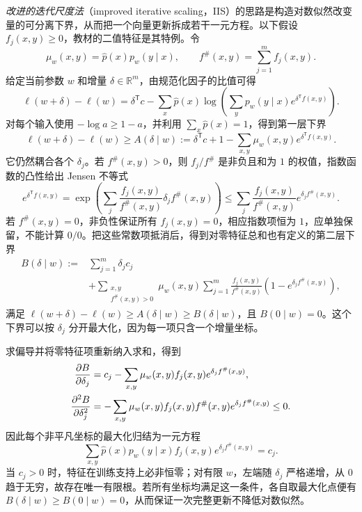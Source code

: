 \emph{改进的迭代尺度法}（improved iterative scaling，IIS）的思路是构造对数似然改变量的可分离下界，从而把一个向量更新拆成若干一元方程。以下假设 $f_j(x,y)\geq0$，教材的二值特征是其特例。令
\[
\mu_w(x,y)=\widehat p(x)p_w(y\mid x),\qquad
f^\#(x,y)=\sum_{j=1}^mf_j(x,y).
\]
给定当前参数 $w$ 和增量 $\delta\in\mathbb R^m$，由规范化因子的比值可得
\begin{equation}
\ell(w+\delta)-\ell(w)
=\delta^{\mathsf T}c-\sum_x\widehat p(x)
\log\left(\sum_yp_w(y\mid x)e^{\delta^{\mathsf T}f(x,y)}\right).
\label{eq:lh-iis-difference}
\end{equation}
对每个输入使用 $-\log a\geq1-a$，并利用 $\sum_x\widehat p(x)=1$，得到第一层下界
\begin{equation}
\ell(w+\delta)-\ell(w)\geq A(\delta\mid w)
:=\delta^{\mathsf T}c+1-\sum_{x,y}\mu_w(x,y)e^{\delta^{\mathsf T}f(x,y)}.
\label{eq:lh-iis-first-bound}
\end{equation}
它仍然耦合各个 $\delta_j$。若 $f^\#(x,y)>0$，则 $f_j/f^\#$ 是非负且和为 $1$ 的权值，指数函数的凸性给出 Jensen 不等式
\begin{equation}
e^{\delta^{\mathsf T}f(x,y)}
=\exp\left(\sum_j\frac{f_j(x,y)}{f^\#(x,y)}\delta_jf^\#(x,y)\right)
\leq\sum_j\frac{f_j(x,y)}{f^\#(x,y)}e^{\delta_jf^\#(x,y)}.
\label{eq:lh-iis-jensen}
\end{equation}
若 $f^\#(x,y)=0$，非负性保证所有 $f_j(x,y)=0$，相应指数项恒为 $1$，应单独保留，不能计算 $0/0$。把这些常数项抵消后，得到对零特征总和也有定义的第二层下界
\begin{equation}
\begin{aligned}
B(\delta\mid w):={}&\sum_{j=1}^m\delta_jc_j\\
&+\sum_{\substack{x,y\\f^\#(x,y)>0}}\mu_w(x,y)
\sum_{j=1}^m\frac{f_j(x,y)}{f^\#(x,y)}
\left(1-e^{\delta_jf^\#(x,y)}\right),
\end{aligned}
\label{eq:lh-iis-separable-bound}
\end{equation}
满足 $\ell(w+\delta)-\ell(w)\geq A(\delta\mid w)\geq B(\delta\mid w)$，且 $B(0\mid w)=0$。这个下界可以按 $\delta_j$ 分开最大化，因为每一项只含一个增量坐标。

求偏导并将零特征项重新纳入求和，得到
\begin{align}
\frac{\partial B}{\partial\delta_j}
&=c_j-\sum_{x,y}\mu_w(x,y)f_j(x,y)e^{\delta_jf^\#(x,y)},\notag\\
\frac{\partial^2 B}{\partial\delta_j^2}
&=-\sum_{x,y}\mu_w(x,y)f_j(x,y)f^\#(x,y)
e^{\delta_jf^\#(x,y)}\leq0.
\label{eq:lh-iis-bound-derivatives}
\end{align}
因此每个非平凡坐标的最大化归结为一元方程
\begin{equation}
\sum_{x,y}\widehat p(x)p_w(y\mid x)f_j(x,y)
e^{\delta_jf^\#(x,y)}=c_j.
\label{eq:lh-iis-update-equation}
\end{equation}
当 $c_j>0$ 时，特征在训练支持上必非恒零；对有限 $w$，左端随 $\delta_j$ 严格递增，从 $0$ 趋于无穷，故存在唯一有限根。若所有坐标均满足这一条件，各自取最大化点便有 $B(\delta\mid w)\geq B(0\mid w)=0$，从而保证一次完整更新不降低对数似然。


